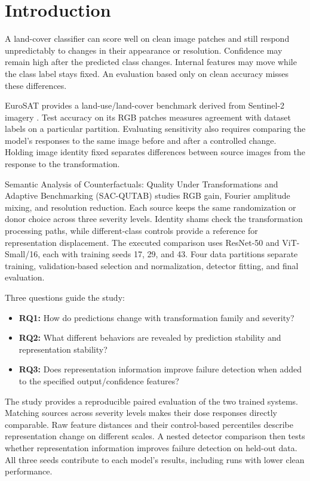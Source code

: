 \section{Introduction}\label{sec:introduction}

A land-cover classifier can score well on clean image patches and still respond unpredictably to changes in their appearance or resolution. Confidence may remain high after the predicted class changes. Internal features may move while the class label stays fixed. An evaluation based only on clean accuracy misses these differences.

EuroSAT provides a land-use/land-cover benchmark derived from Sentinel-2 imagery \cite{eurosat}. Test accuracy on its RGB patches measures agreement with dataset labels on a particular partition. Evaluating sensitivity also requires comparing the model's responses to the same image before and after a controlled change. Holding image identity fixed separates differences between source images from the response to the transformation.

Semantic Analysis of Counterfactuals: Quality Under Transformations and Adaptive Benchmarking (SAC-QUTAB) studies RGB gain, Fourier amplitude mixing, and resolution reduction. Each source keeps the same randomization or donor choice across three severity levels. Identity shams check the transformation processing paths, while different-class controls provide a reference for representation displacement. The executed comparison uses ResNet-50 and ViT-Small/16, each with training seeds 17, 29, and 43. Four data partitions separate training, validation-based selection and normalization, detector fitting, and final evaluation.

Three questions guide the study:

\begin{itemize}
\item \textbf{RQ1:} How do predictions change with transformation family and severity?
\item \textbf{RQ2:} What different behaviors are revealed by prediction stability and representation stability?
\item \textbf{RQ3:} Does representation information improve failure detection when added to the specified output/confidence features?

\end{itemize}
The study provides a reproducible paired evaluation of the two trained systems. Matching sources across severity levels makes their dose responses directly comparable. Raw feature distances and their control-based percentiles describe representation change on different scales. A nested detector comparison then tests whether representation information improves failure detection on held-out data. All three seeds contribute to each model's results, including runs with lower clean performance.

